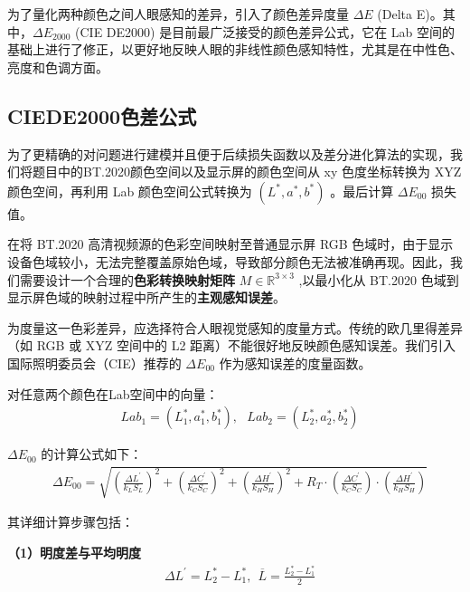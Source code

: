 为了量化两种颜色之间人眼感知的差异，引入了颜色差异度量 $\Delta E$ (Delta E)。其中，$\Delta E_{2000}$ (CIE DE2000) 是目前最广泛接受的颜色差异公式，它在 Lab 空间的基础上进行了修正，以更好地反映人眼的非线性颜色感知特性，尤其是在中性色、亮度和色调方面。

\subsection[\hspace{-2pt}CIEDE2000色差公式]{{\heiti{} \hspace{-8pt}CIEDE2000色差公式}}\label{subsection2: CIEDE2000色差公式}

为了更精确的对问题进行建模并且便于后续损失函数以及差分进化算法的实现，我们将题目中的BT.2020颜色空间以及显示屏的颜色空间从 xy 色度坐标转换为 XYZ 颜色空间，再利用 Lab 颜色空间公式转换为 $(L^{*},a^{*},b^{*})$ 。最后计算 $\Delta E_{00}$ 损失值。

在将 BT.2020 高清视频源的色彩空间映射至普通显示屏 RGB 色域时，由于显示设备色域较小，无法完整覆盖原始色域，导致部分颜色无法被准确再现。因此，我们需要设计一个合理的\textbf{色彩转换映射矩阵} $M\in \mathbb{R}^{3\times 3}$ ,以最小化从 BT.2020 色域到显示屏色域的映射过程中所产生的\textbf{主观感知误差}。

为度量这一色彩差异，应选择符合人眼视觉感知的度量方式。传统的欧几里得差异（如 RGB 或 XYZ 空间中的 L2 距离）不能很好地反映颜色感知误差。我们引入国际照明委员会（CIE）推荐的 $\Delta E_{00}$ 作为感知误差的度量函数。

对任意两个颜色在Lab空间中的向量：
\begin{equation}
\begin{aligned}
  &Lab_{1} = (L^{*}_{1},a^{*}_{1},b^{*}_{1}),\ \ \ Lab_{2}=(L^{*}_{2},a^{*}_{2},b^{*}_{2})
\end{aligned}
\end{equation}

$\Delta E_{00}$ 的计算公式如下\cite{YSZL200407020}：
\begin{equation}
\begin{aligned}
  &\Delta E_{00}=\sqrt{(\frac{\Delta L^{'}}{k_{L}S_{L}})^{2}+(\frac{\Delta C^{'}}{k_{C}S_{C}})^{2}+(\frac{\Delta H^{'}}{k_{H}S_{H}})^{2}+R_{T}\cdot{(\frac{\Delta C^{'}}{k_{C}S_{C}})}\cdot (\frac{\Delta H^{'}}{k_{H}S_{H}})}
\end{aligned}
\end{equation}

其详细计算步骤包括：

\textbf{（1）明度差与平均明度}
\begin{equation}
\begin{aligned}
   &\Delta L^{'} = L^{*}_{2}-L^{*}_{1},\ \ \overline{L}=\frac{L^{*}_{2}-L^{*}_{1}}{2}
\end{aligned}
\end{equation}

